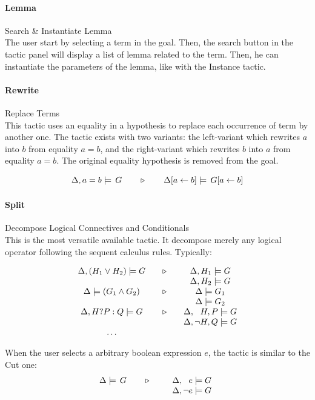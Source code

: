 \paragraph{Lemma} Search \& Instantiate Lemma\\
The user start by selecting a term in the goal. Then, the search button in the tactic panel will display a list of lemma related to the term. Then, he can instantiate the parameters of the lemma, like with the Instance tactic.

\paragraph{Rewrite} Replace Terms\\
This tactic uses an equality in a hypothesis to replace each occurrence of term by another one.
The tactic exists with two variants: the left-variant which rewrites $a$ into $b$ from equality $a=b$,
and the right-variant which rewrites $b$ into $a$ from equality $a=b$.
The original equality hypothesis is removed from the goal.

$$\Delta,a=b\models\,G\quad\quad\triangleright\quad\quad\Delta[a\leftarrow b]\models\,G[a\leftarrow b]$$

\paragraph{Split} Decompose Logical Connectives and Conditionals\\
This is the most versatile available tactic. It decompose merely any logical operator following the sequent calculus rules. Typically:

\[
\begin{array}{c@{\quad\quad}c@{\quad\quad}c}
  \Delta,(H_1\vee H_2)\models G & \triangleright &
     \Delta,H_1 \models G \\
  && \Delta,H_2 \models G \\
  \Delta\models(G_1\wedge G_2) & \triangleright &
     \Delta\models G_1 \\
  && \Delta\models G_2 \\
  \Delta,H?P:Q\models G & \triangleright &
     \Delta,\phantom{\neg}H,P\models G \\
  && \Delta,\neg H,Q\models G \\
  \ldots
\end{array}
\]

When the user selects a arbitrary boolean expression $e$, the tactic is similar to the Cut one:
\[\TACTIC{\Delta\models\,G}{%
\begin{array}[t]{l}
\Delta,\phantom{\neg}e\models G \\
\Delta,\neg e\models G
\end{array}} \]

